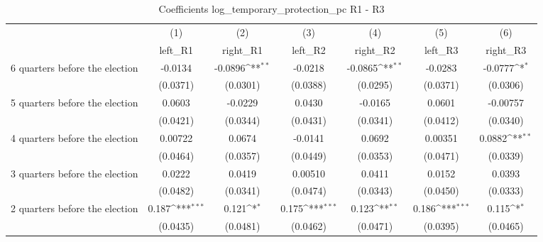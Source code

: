 \begin{table}[htbp]\centering
\def\sym#1{\ifmmode^{#1}\else\(^{#1}\)\fi}
\caption{Coefficients log\_temporary\_protection\_pc R1 - R3}
\begin{tabular}{l*{6}{c}}
\hline\hline
                    &\multicolumn{1}{c}{(1)}&\multicolumn{1}{c}{(2)}&\multicolumn{1}{c}{(3)}&\multicolumn{1}{c}{(4)}&\multicolumn{1}{c}{(5)}&\multicolumn{1}{c}{(6)}\\
                    &\multicolumn{1}{c}{left\_R1}&\multicolumn{1}{c}{right\_R1}&\multicolumn{1}{c}{left\_R2}&\multicolumn{1}{c}{right\_R2}&\multicolumn{1}{c}{left\_R3}&\multicolumn{1}{c}{right\_R3}\\
\hline
 6 quarters before the election&     -0.0134         &     -0.0896\sym{**} &     -0.0218         &     -0.0865\sym{**} &     -0.0283         &     -0.0777\sym{*}  \\
                    &    (0.0371)         &    (0.0301)         &    (0.0388)         &    (0.0295)         &    (0.0371)         &    (0.0306)         \\
[1em]
 5 quarters before the election&      0.0603         &     -0.0229         &      0.0430         &     -0.0165         &      0.0601         &    -0.00757         \\
                    &    (0.0421)         &    (0.0344)         &    (0.0431)         &    (0.0341)         &    (0.0412)         &    (0.0340)         \\
[1em]
 4 quarters before the election&     0.00722         &      0.0674         &     -0.0141         &      0.0692         &     0.00351         &      0.0882\sym{**} \\
                    &    (0.0464)         &    (0.0357)         &    (0.0449)         &    (0.0353)         &    (0.0471)         &    (0.0339)         \\
[1em]
 3 quarters before the election&      0.0222         &      0.0419         &     0.00510         &      0.0411         &      0.0152         &      0.0393         \\
                    &    (0.0482)         &    (0.0341)         &    (0.0474)         &    (0.0343)         &    (0.0450)         &    (0.0333)         \\
[1em]
 2 quarters before the election&       0.187\sym{***}&       0.121\sym{*}  &       0.175\sym{***}&       0.123\sym{**} &       0.186\sym{***}&       0.115\sym{*}  \\
                    &    (0.0435)         &    (0.0481)         &    (0.0462)         &    (0.0471)         &    (0.0395)         &    (0.0465)         \\

\end{tabular}
\end{table}

